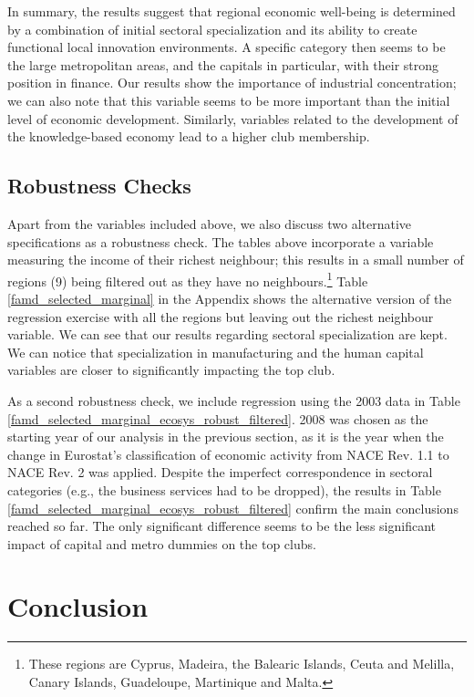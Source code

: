 \documentclass[11pt]{article}
\begin{document}
In summary, the results suggest that regional economic well-being is determined by a combination of initial sectoral specialization and its ability to create functional local innovation environments. A specific category then seems to be the large metropolitan areas, and the capitals in particular, with their strong position in finance. Our results show the importance of industrial concentration; we can also note that this variable seems to be more important than the initial level of economic development. Similarly, variables related to the development of the knowledge-based economy lead to a higher club membership.

\subsection{Robustness Checks}
Apart from the variables included above, we also discuss two alternative specifications as a robustness check. The tables above incorporate a variable measuring the income of their richest neighbour; this results in a small number of regions (9) being filtered out as they have no neighbours.\footnote{These regions are Cyprus, Madeira, the Balearic Islands, Ceuta and Melilla, Canary Islands, Guadeloupe, Martinique and Malta.} Table \ref{famd_selected_marginal} in the Appendix shows the alternative version of the regression exercise with all the regions but leaving out the richest neighbour variable. We can see that our results regarding sectoral specialization are kept. We can notice that specialization in manufacturing and the human capital variables are closer to significantly impacting the top club.

As a second robustness check, we include regression using the 2003 data in Table \ref{famd_selected_marginal_ecosys_robust_filtered}.  2008 was chosen as the starting year of our analysis in the previous section, as it is the year when the change in Eurostat's classification of economic activity from NACE Rev. 1.1 to NACE Rev. 2 was applied. Despite the imperfect correspondence in sectoral categories (e.g., the business services had to be dropped), the results in Table \ref{famd_selected_marginal_ecosys_robust_filtered} confirm the main conclusions reached so far. The only significant difference seems to be the less significant impact of capital and metro dummies on the top clubs.

\section{Conclusion}
\end{document}
